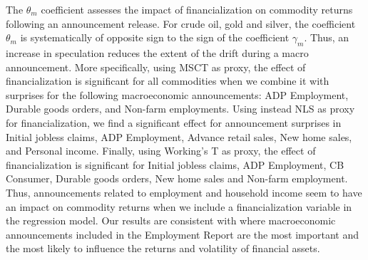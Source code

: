 \documentclass[12pt]{article}
\begin{document}
The $\theta_m$ coefficient assesses the impact of financialization on commodity returns following an announcement release. For crude oil, gold and silver, the coefficient $\theta_m$ is systematically of opposite sign to the sign of the coefficient $\gamma_m$. Thus, an increase in speculation reduces the extent of the drift during a macro  announcement. More specifically, using MSCT as proxy, the effect of financialization is significant for all commodities when we combine it with surprises for the following macroeconomic announcements: ADP Employment, Durable goods orders, and Non-farm employments. Using instead NLS as proxy for financialization, we find a significant effect for announcement surprises in Initial jobless claims, ADP Employment, Advance retail sales, New home sales, and Personal income. Finally, using Working's T as proxy, the effect of financialization is significant for  Initial jobless claims, ADP Employment, CB Consumer, Durable goods orders, New home sales and Non-farm employment. Thus,  announcements related to employment and household income seem to have an impact on commodity returns when we include a financialization variable in the regression model. Our results are consistent with \citet{hordahl2015expectations} where macroeconomic announcements included in the Employment Report are the most important and the most likely to influence the returns and  volatility of financial assets.
  
\end{document}
